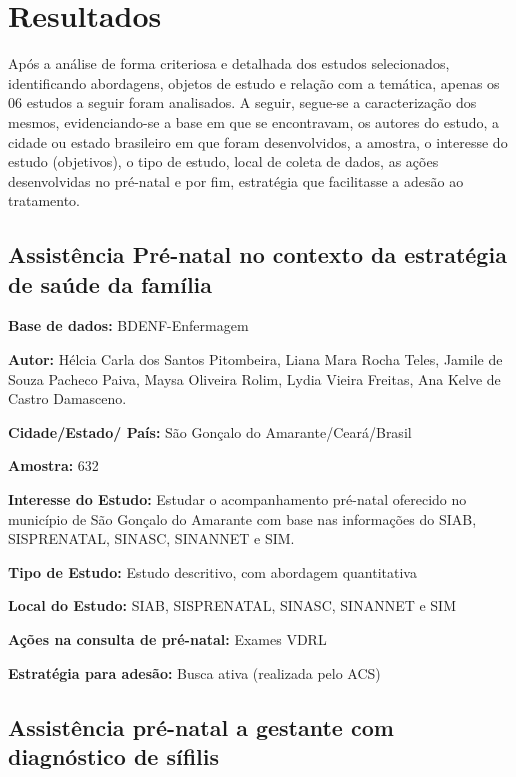 \chapter{Resultados}
\label{chap:resultados}

Após a análise de forma criteriosa e detalhada dos estudos selecionados, identificando abordagens, objetos de estudo e relação com a temática, apenas os 06 estudos a seguir foram analisados. A seguir, segue-se a caracterização dos mesmos, evidenciando-se a base em que se encontravam, os autores do estudo, a cidade ou estado brasileiro em que foram desenvolvidos, a amostra, o interesse do estudo (objetivos), o tipo de estudo, local de coleta de dados, as ações desenvolvidas no pré-natal e por fim, estratégia que facilitasse a adesão ao tratamento. 	 	 	 	 	

\section{Assistência Pré-natal no contexto da estratégia de saúde da família \cite{dos2010assistencia}}

\begin{description}
\item \textbf{Base de dados:} BDENF-Enfermagem
\item \textbf{Autor:} Hélcia Carla dos Santos Pitombeira, Liana Mara Rocha Teles, Jamile de Souza Pacheco Paiva, Maysa Oliveira Rolim, Lydia Vieira Freitas, Ana Kelve de Castro Damasceno.
\item \textbf{Cidade/Estado/ País:} São Gonçalo do Amarante/Ceará/Brasil
\item \textbf{Amostra:} 632
\item \textbf{Interesse do Estudo:} Estudar o acompanhamento pré-natal oferecido no município de São Gonçalo do Amarante com base nas informações do SIAB, SISPRENATAL, SINASC, SINANNET e SIM.
\item \textbf{Tipo de Estudo:} Estudo descritivo, com abordagem quantitativa
\item \textbf{Local do Estudo:} SIAB, SISPRENATAL, SINASC, SINANNET e SIM
\item \textbf{Ações na consulta de pré-natal:} Exames VDRL
\item \textbf{Estratégia para adesão:} Busca ativa (realizada pelo ACS)
\end{description}

\section{Assistência pré-natal a gestante com diagnóstico de sífilis \cite{suto2016assistencia}}

